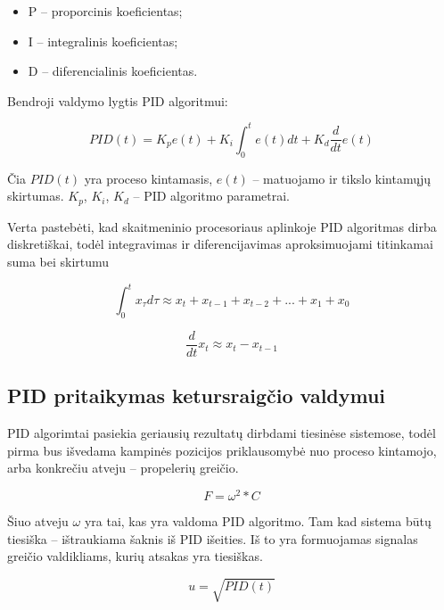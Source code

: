 \documentclass[12pt, a4paper, lithuanian, final]{article}
\begin{document}
\begin{itemize}
	\item P -- proporcinis koeficientas;
	\item I -- integralinis koeficientas;
	\item D -- diferencialinis koeficientas.
\end{itemize}

Bendroji valdymo lygtis PID algoritmui:

\begin{equation}
	PID(t) = K_p e(t) + K_i \int_0^t e(t) dt + K_d \dfrac{d}{dt} e(t)
\end{equation}

Čia $PID(t)$ yra proceso kintamasis, $e(t)$ -- matuojamo ir tikslo kintamųjų skirtumas.
$K_p$, $K_i$, $K_d$ -- PID algoritmo parametrai.

Verta pastebėti, kad skaitmeninio procesoriaus aplinkoje PID algoritmas dirba diskretiškai, todėl integravimas ir diferencijavimas aproksimuojami titinkamai suma bei skirtumu

\begin{equation}
	\int_0^t x_{\tau}d\tau \approx x_t + x_{t - 1} + x_{t - 2} + ... + x_{1} + x_{0}
\end{equation}

\begin{equation}
	\dfrac{d}{dt}x_t \approx x_t - x_{t - 1}
\end{equation}



\subsection{PID pritaikymas ketursraigčio valdymui}

PID algorimtai pasiekia geriausių rezultatų dirbdami tiesinėse sistemose, todėl pirma bus išvedama kampinės pozicijos priklausomybė nuo proceso kintamojo, arba konkrečiu atveju -- propelerių greičio.

\begin{equation}
	F = \omega^2 * C
\end{equation}

Šiuo atveju $\omega$ yra tai, kas yra valdoma PID algoritmo. Tam kad sistema būtų tiesiška -- ištraukiama šaknis iš PID išeities.
Iš to yra formuojamas signalas greičio valdikliams, kurių atsakas yra tiesiškas.

\begin{equation}
	u = \sqrt{PID(t)}
\end{equation}
\end{document}

